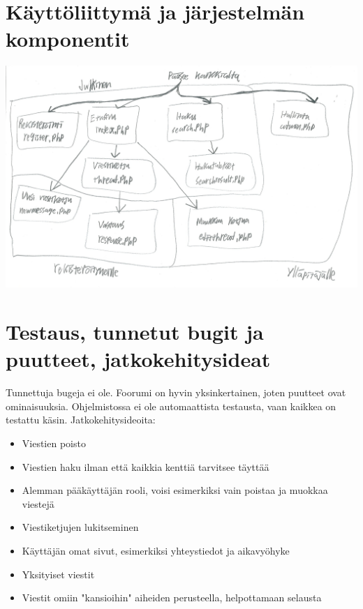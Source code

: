 \documentclass[a4paper, 12pt, finnish]{article}
\begin{document}
\newpage

\section{Käyttöliittymä ja järjestelmän komponentit}
\includegraphics[width=\textwidth,height=\textheight,keepaspectratio]{kayttoliittyma.png}

\newpage

\section{Testaus, tunnetut bugit ja puutteet, jatkokehitysideat}
Tunnettuja bugeja ei ole.
Foorumi on hyvin yksinkertainen, joten puutteet ovat ominaisuuksia.
Ohjelmistossa ei ole automaattista testausta, vaan kaikkea on testattu käsin.
Jatkokehitysideoita:
\begin{itemize}
\item
Viestien poisto
\item
Viestien haku ilman että kaikkia kenttiä tarvitsee täyttää
\item
Alemman pääkäyttäjän rooli, voisi esimerkiksi vain poistaa ja muokkaa viestejä
\item
Viestiketjujen lukitseminen
\item
Käyttäjän omat sivut, esimerkiksi yhteystiedot ja aikavyöhyke
\item
Yksityiset viestit
\item
Viestit omiin "kansioihin" aiheiden perusteella, helpottamaan selausta
\end{itemize}
\end{document}
